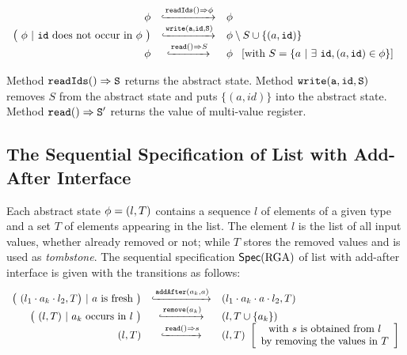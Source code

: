 \[
  \begin{array}{rcl}
    \abstate
    & \specarrow{\alabellong[\mathtt{readIds}]{}{\abstate}{}}
    & \abstate\\
    \big(\ \abstate\ |\ \mathtt{id}\ \text{does not occur in } \abstate\ \big)
             & \specarrow{ \alabelshort[{\tt write}]{a,id,S} }
    & \abstate \setminus S \cup \{ (a,\mathtt{id}) \}\\
    \abstate
    & \specarrow{\alabellong[\mathtt{read}]{}{ S }{}}
    & \abstate\
      \begin{array}{c}
        [\text{with}\ S = \{ a\ \vert\ \exists\ \mathtt{id}, (a,\mathtt{id}) \in \abstate \}]
      \end{array}
  \end{array}
\]

Method $\alabellong[{\tt readIds}]{}{S}{}$ returns the abstract state. Method $\alabelshort[{\tt write}]{a,id,S}$ removes $S$ from the abstract state and puts $\{ (a,id) \}$ into the abstract state. Method $\alabellong[{\tt read}]{}{S'}{}$ returns the value of multi-value register.




\subsection{The Sequential Specification of List with Add-After Interface}
\label{subsec:the sequential specification of list with add-after interface}

Each abstract state $\abstate = (l,T)$ contains a sequence $l$ of elements of a given type and a set $T$ of elements appearing in the list. The element $l$ is the list of all input values, whether already removed or not; while $T$ stores the removed values and is used as \emph{tombstone}. The sequential specification $\specRGA$ of list with add-after interface is given with the transitions as follows:
\[
  \begin{array}{rcl}
    \big(\ (l_1 \cdot a_k \cdot l_2,T\big)\ |\ a\text{ is fresh}\ \big)
     & \specarrow{\alabelshort[\mathtt{addAfter}]{a_k,a}}
     & (l_1 \cdot a_k \cdot a \cdot l_2,T)\\
     \big(\ (l,T)\ |\ a_k\ \text{occurs in}\ l\ \big)
     & \specarrow{\alabelshort[\mathtt{remove}]{a_k}}
     & (l,T \cup \{a_k\})\\
     (l,T)
     & \specarrow{\alabellong[\mathtt{read}]{}{s}{}}
     & (l,T)\
       \left[\begin{array}{c}
           \text{with $s$ is obtained from $l$}\\
           \text{by removing the values in $T$}
       \end{array}\right]
   \end{array}
\]

